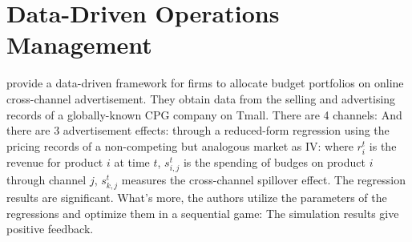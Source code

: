 \documentclass[12pt]{report}
\begin{document}
\clearpage
\section{Data-Driven Operations Management}

\cite{Deng2023} provide a data-driven framework for firms to allocate budget portfolios on online cross-channel advertisement.
They obtain data from the selling and advertising records of a globally-known CPG company on Tmall. There are 4 channels:
And there are 3 advertisement effects:
through a reduced-form regression using the pricing records of a non-competing but analogous market as IV:
where $r_i^t$ is the revenue for product $i$ at time $t$, $s_{i,j}^t$ is the spending of budges on product $i$ through channel $j$, $s_{k,j}^t$ measures the cross-channel spillover effect. The regression
results are significant. What's more, the authors utilize the parameters of the regressions and optimize them in a sequential game:
The simulation results give positive feedback.

\clearpage
\end{document}
